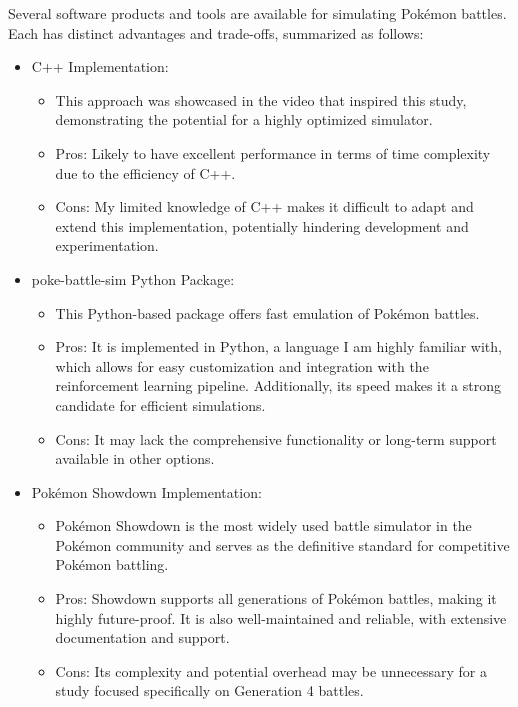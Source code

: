 Several software products and tools are available for simulating Pokémon battles. Each has distinct advantages and trade-offs, summarized as follows:
\begin{itemize}
    \item C++ Implementation:
    \begin{itemize}
        \item This approach was showcased in the video that inspired this study, demonstrating the potential for a highly optimized simulator.
        \item Pros: Likely to have excellent performance in terms of time complexity due to the efficiency of C++.
        \item Cons: My limited knowledge of C++ makes it difficult to adapt and extend this implementation, potentially hindering development and experimentation.
    \end{itemize}
    \item poke-battle-sim Python Package:
    \begin{itemize}
        \item This Python-based package offers fast emulation of Pokémon battles.
        \item Pros: It is implemented in Python, a language I am highly familiar with, which allows for easy customization and integration with the reinforcement learning pipeline. Additionally, its speed makes it a strong candidate for efficient simulations.
        \item Cons: It may lack the comprehensive functionality or long-term support available in other options.
    \end{itemize}
    \item Pokémon Showdown Implementation:
    \begin{itemize}
        \item Pokémon Showdown is the most widely used battle simulator in the Pokémon community and serves as the definitive standard for competitive Pokémon battling.
        \item Pros: Showdown supports all generations of Pokémon battles, making it highly future-proof. It is also well-maintained and reliable, with extensive documentation and support.
        \item Cons: Its complexity and potential overhead may be unnecessary for a study focused specifically on Generation 4 battles.
    \end{itemize}
\end{itemize}

